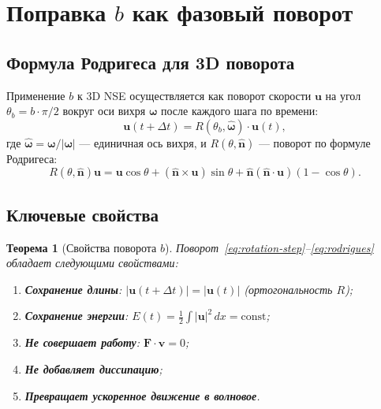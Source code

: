 \documentclass[11pt,a4paper,twoside]{article}
\newtheorem{theorem}{Теорема}[section]
\theoremstyle{remark}
\begin{document}
\section{Поправка \texorpdfstring{$b$}{b} как фазовый поворот}
\label{sec:rotation-theory}

\subsection{Формула Родригеса для 3D поворота}

Применение $b$ к 3D NSE осуществляется как поворот скорости $\mathbf{u}$ на угол $\theta_b = b\cdot\pi/2$ вокруг оси вихря $\boldsymbol{\omega}$ после каждого шага по времени:
\begin{equation}
\mathbf{u}(t+\Delta t) = R(\theta_b, \hat{\boldsymbol{\omega}})\cdot\mathbf{u}(t),
\label{eq:rotation-step}
\end{equation}
где $\hat{\boldsymbol{\omega}} = \boldsymbol{\omega}/|\boldsymbol{\omega}|$ --- единичная ось вихря, и $R(\theta, \hat{\mathbf{n}})$ --- поворот по формуле Родригеса:
\begin{equation}
R(\theta, \hat{\mathbf{n}})\mathbf{u} = \mathbf{u}\cos\theta + (\hat{\mathbf{n}}\times\mathbf{u})\sin\theta + \hat{\mathbf{n}}(\hat{\mathbf{n}}\cdot\mathbf{u})(1-\cos\theta).
\label{eq:rodrigues}
\end{equation}

\subsection{Ключевые свойства}

\begin{theorem}[Свойства поворота $b$]
\label{thm:rotation-properties}
Поворот~\eqref{eq:rotation-step}--\eqref{eq:rodrigues} обладает следующими свойствами:
\begin{enumerate}
    \item \textbf{Сохранение длины}: $|\mathbf{u}(t+\Delta t)| = |\mathbf{u}(t)|$ (ортогональность $R$);
    \item \textbf{Сохранение энергии}: $E(t) = \tfrac{1}{2}\int|\mathbf{u}|^2\,dx = \mathrm{const}$;
    \item \textbf{Не совершает работу}: $\mathbf{F}\cdot\mathbf{v} = 0$;
    \item \textbf{Не добавляет диссипацию};
    \item \textbf{Превращает ускоренное движение в волновое}.
\end{enumerate}
\end{theorem}
\end{document}
